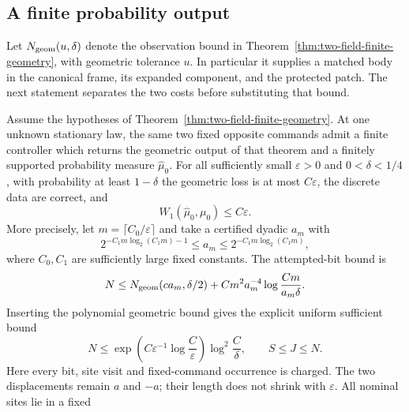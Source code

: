 \subsection{A finite probability output}
Let $N_{\rm geom}(u,\delta)$ denote the observation bound in
Theorem~\ref{thm:two-field-finite-geometry}, with geometric tolerance
$u$.  In particular it supplies a matched body in the canonical
frame, its expanded component, and the protected patch.  The next
statement separates the two costs before substituting that bound.

\begin{theorem}
\label{thm:two-field-finite-law}
Assume the hypotheses of Theorem~\ref{thm:two-field-finite-geometry}.
At one unknown stationary law, the same two fixed opposite commands
admit a finite controller which returns the geometric output of that
theorem and a finitely supported probability measure $\widehat\mu_0$.
For all sufficiently small $\varepsilon>0$ and $0<\delta<1/4$,
with probability at least $1-\delta$ the geometric loss is at most
$C\varepsilon$, the discrete data are correct, and
\begin{equation}\label{eq:two-field-finite-wasserstein}
                         W_1(\widehat\mu_0,\mu_0)
                                      \le C\varepsilon.
\end{equation}
More precisely, let $m=\lceil C_0/\varepsilon\rceil$ and take a
certified dyadic $a_m$ with
\begin{equation}\label{eq:two-field-moment-tolerance}
 2^{-C_1m\log_2(C_1m)-1}
       \le a_m\le 2^{-C_1m\log_2(C_1m)},
\end{equation}
where $C_0,C_1$ are sufficiently large fixed constants.  The
attempted-bit bound is
\begin{equation}\label{eq:two-field-joint-decomposed-cost}
 N\le N_{\rm geom}(c a_m,\delta/2)
       +Cm^2a_m^{-4}\log\frac{Cm}{a_m\delta}.
\end{equation}
Inserting the polynomial geometric bound gives the explicit uniform
sufficient bound
\begin{equation}\label{eq:two-field-joint-exponential-cost}
 N\le\exp\!\left(C\varepsilon^{-1}
                       \log\frac{C}{\varepsilon}\right)
                    \log^2\frac{C}{\delta},
                \qquad S\le J\le N.
\end{equation}
Here every bit, site visit and fixed-command occurrence is charged.
The two displacements remain $a$ and $-a$; their length does not
shrink with $\varepsilon$.  All nominal sites lie in a fixed

\end{theorem}
